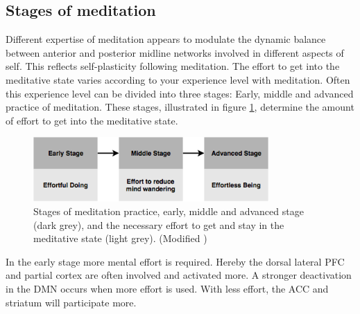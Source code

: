 \subsection{Stages of meditation}
Different expertise of meditation appears to modulate the dynamic balance between anterior and posterior midline networks involved in different aspects of self. This reflects self-plasticity following meditation. 
The effort to get into the meditative state varies according to your experience level with meditation. Often this experience level can be divided into three stages: Early, middle and advanced practice of meditation. These stages, illustrated in figure \ref{fig:meditation_stages}, determine the amount of effort to get into the meditative state. \cite{Tang2017} 

\begin{figure}[H]
\includegraphics[width=0.8\textwidth]{figures/stages_of_meditation.png} 
\caption{Stages of meditation practice, early, middle and advanced stage (dark grey), and the necessary effort to get and stay in the meditative state (light grey). (Modified \cite{Tang2017})}
	\label{fig:meditation_stages}  
\end{figure}  

In the early stage more mental effort is required. Hereby the dorsal lateral PFC and partial cortex are often involved and activated more. A stronger deactivation in the DMN occurs when more effort is used. With less effort, the ACC and striatum will participate more. \cite{Tang2017}




